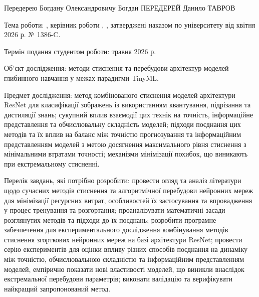 \documentclass{pma-mthesis}
\begin{document}
\begin{assignment}{Передерею Богдану Олександровичу}
        {Богдан ПЕРЕДЕРЕЙ}
        {Данило ТАВРОВ}
    \item Тема роботи: \inquot{\theme}, керівник роботи \supervisor{}, \supervisorTitles{}, затверджені наказом по університету від  квітня 2026 р. № 1386-C.

    \item Термін подання студентом роботи:  травня 2026 р.

    \item Об’єкт дослідження: методи стиснення та перебудови архітектур моделей глибинного навчання у межах парадигми TinyML.

    \item Предмет дослідження: метод комбінованого стиснення моделей архітектури ResNet для класифікації зображень із використанням квантування, підрізання та дистиляції знань; сукупний вплив взаємодії цих технік на точність, інформаційне представлення та обчислювальну складність моделей; підходи поєднання цих методів та їх вплив на баланс між точністю прогнозування та інформаційним представленням моделей з метою досягнення максимального рівня стиснення з мінімальними втратами точності; механізми мінімізації похибок, що виникають при екстремальному стисненні.
    
    \item Перелік завдань, які потрібно розробити: провести огляд та аналіз літератури щодо сучасних методів стиснення та алгоритмічної перебудови нейронних мереж для мінімізації ресурсних витрат, особливостей їх застосування та впровадження у процес тренування та розгортання; проаналізувати математичні засади розглянутих методів та підходи до їх поєднань; розробити програмне забезпечення для експериментального дослідження комбінування методів стиснення згорткових нейронних мереж на базі архітектури ResNet; провести серію експериментів для оцінки впливу різних способів поєднання на динаміку між точністю, обчислювальною складністю та інформаційним представленням моделей, емпірично показати нові властивості моделей, що виникли внаслідок екстремальної перебудови параметрів; виконати валідацію та верифікувати найкращий запропонований метод.
    

\end{assignment}
\end{document}
